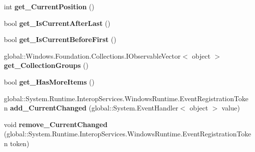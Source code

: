 \begin{DoxyCompactItemize}
int {\bfseries get\+\_\+\+Current\+Position} ()
\item 
\mbox{\label{interface_windows_1_1_u_i_1_1_xaml_1_1_data_1_1_i_collection_view_a478e1eca1b915f6c0741a4c1401176a0}} 
bool {\bfseries get\+\_\+\+Is\+Current\+After\+Last} ()
\item 
\mbox{\label{interface_windows_1_1_u_i_1_1_xaml_1_1_data_1_1_i_collection_view_a6cb419f2cf548fb6ecdd5ece10c84b37}} 
bool {\bfseries get\+\_\+\+Is\+Current\+Before\+First} ()
\item 
\mbox{\label{interface_windows_1_1_u_i_1_1_xaml_1_1_data_1_1_i_collection_view_ad162ea2427cc1f950600c9a28bc40a2f}} 
global\+::\+Windows.\+Foundation.\+Collections.\+I\+Observable\+Vector$<$ object $>$ {\bfseries get\+\_\+\+Collection\+Groups} ()
\item 
\mbox{\label{interface_windows_1_1_u_i_1_1_xaml_1_1_data_1_1_i_collection_view_aec8115295fb03164ca68a5a9f2651054}} 
bool {\bfseries get\+\_\+\+Has\+More\+Items} ()
\item 
\mbox{\label{interface_windows_1_1_u_i_1_1_xaml_1_1_data_1_1_i_collection_view_a617dea4435e2a2a52dc87193df28e8dc}} 
global\+::\+System.\+Runtime.\+Interop\+Services.\+Windows\+Runtime.\+Event\+Registration\+Token {\bfseries add\+\_\+\+Current\+Changed} (global\+::\+System.\+Event\+Handler$<$ object $>$ value)
\item 
\mbox{\label{interface_windows_1_1_u_i_1_1_xaml_1_1_data_1_1_i_collection_view_a44b0918807f968027d0578f623c02f67}} 
void {\bfseries remove\+\_\+\+Current\+Changed} (global\+::\+System.\+Runtime.\+Interop\+Services.\+Windows\+Runtime.\+Event\+Registration\+Token token)
\item 
\mbox{\label{interface_windows_1_1_u_i_1_1_xaml_1_1_data_1_1_i_collection_view_afb83479ac9e19cc076a82ee507d64a75}} 

\end{DoxyCompactItemize}
